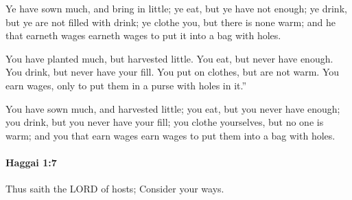 			\begin{versebox}
					\item[BHS] 
					\item[LXX] 
					\item[ASV] Ye have sown much, and bring in little; ye eat, but ye have not enough; ye drink, but ye are not filled with drink; ye clothe you, but there is none warm; and he that earneth wages earneth wages to put it into a bag with holes.
					\item[NIV] You have planted much, but harvested little. You eat, but never have enough. You drink, but never have your fill. You put on clothes, but are not warm. You earn wages, only to put them in a purse with holes in it.”
					\item[NRSV] You have sown much, and harvested little; you eat, but you never have enough; you drink, but you never have your fill; you clothe yourselves, but no one is warm; and you that earn wages earn wages to put them into a bag with holes.
			\end{versebox}

		\paragraph{Haggai 1:7} %
			\label{HAGGAI-1-7}

			Thus saith the LORD of hosts; Consider your ways.

